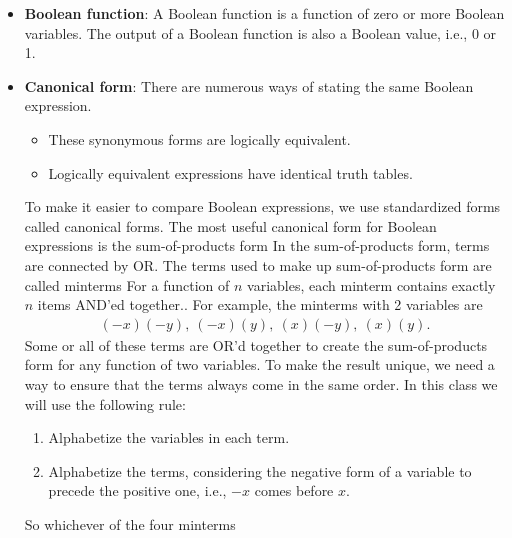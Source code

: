\documentclass{report}
\begin{document}
\begin{itemize}
        \item \textbf{Boolean function}: A Boolean function is a function of zero or more Boolean variables.
            \bigbreak \noindent 
            The output of a Boolean function is also a Boolean value, i.e., 0 or 1.
        \item \textbf{Canonical form}: There are numerous ways of stating the same Boolean expression.
            \begin{itemize}
                \item These synonymous forms are logically equivalent.
                \item Logically equivalent expressions have identical truth tables.
            \end{itemize}
            \bigbreak \noindent 
            To make it easier to compare Boolean expressions, we use standardized forms called canonical forms.
            \bigbreak \noindent 
            The most useful canonical form for Boolean expressions is the sum-of-products form
            \bigbreak \noindent 
            In the sum-of-products form, terms are connected by OR.
            \bigbreak \noindent 
            The terms used to make up sum-of-products form are called minterms
            \bigbreak \noindent 
            For a function of $n$ variables, each minterm contains exactly $n$ items AND'ed together..
            \bigbreak \noindent 
            For example, the minterms with 2 variables are
            \begin{align*}
                (-x)(-y),\ (-x)(y),\ (x)(-y),\ (x)(y)
            .\end{align*}
            \bigbreak \noindent 
            Some or all of these terms are OR'd together to create the sum-of-products form for any function of two variables.
            \bigbreak \noindent 
            To make the result unique, we need a way to ensure that the terms always come in the same order.
            \bigbreak \noindent 
            In this class we will use the following rule:
            \begin{enumerate}
                \item Alphabetize the variables in each term.
                \item Alphabetize the terms, considering the negative form of a variable to precede the positive one, i.e., $-x$ comes before $x$.
            \end{enumerate}
            \bigbreak \noindent 
            So whichever of the four minterms
            \begin{align*}

\end{align*}
\end{itemize}
\end{document}
